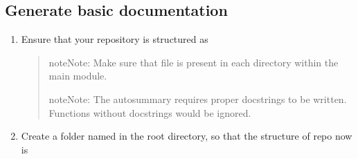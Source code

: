\documentclass[letterpaper,10pt,english]{sphinxmanual}
\begin{document}
\subsection{Generate basic documentation}
\label{\detokenize{usage:generate-basic-documentation}}\label{\detokenize{usage:generatebasic}}\begin{enumerate}
%
\item {} 
\sphinxAtStartPar
Ensure that your repository is structured as
\begin{quote}

\begin{sphinxVerbatim}[commandchars=\\\{\}]
 
   
   
   
  
 
 
\end{sphinxVerbatim}

\begin{sphinxadmonition}{note}{Note:}
\sphinxAtStartPar
Make sure that  file is present in each directory within the main module.
\end{sphinxadmonition}

\begin{sphinxadmonition}{note}{Note:}
\sphinxAtStartPar
The auto\sphinxhyphen{}summary requires proper docstrings to be written. Functions without docstrings would be ignored.
\end{sphinxadmonition}
\end{quote}

\item {} 
\sphinxAtStartPar
Create a folder named  in the root directory, so that the structure of repo now is
\begin{quote}

%
\begin{sphinxVerbatim}[commandchars=\\\{\}]
 
 
   
   
   
  
 
 
\end{sphinxVerbatim}
\sphinxresetverbatimhllines
\end{quote}


\end{enumerate}
\end{document}
